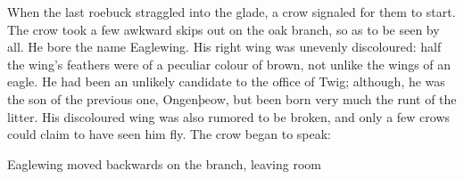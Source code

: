 When the last roebuck straggled into the glade, a crow signaled for them to start. The crow took a few awkward skips out on the oak branch, so as to be seen by all. He bore the name Eaglewing. His right wing was unevenly discoloured: half the wing's feathers were of a peculiar colour of brown, not unlike the wings of an eagle. He had been an unlikely candidate to the office of Twig; although, he was the son of the previous one, Ongenþeow, but been born very much the runt of the litter. His discoloured wing was also rumored to be broken, and only a few crows could claim to have seen him fly. The crow began to speak:



Eaglewing moved backwards on the branch, leaving room 


